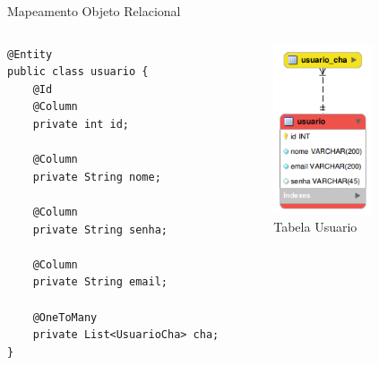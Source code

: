 \documentclass[xcolor=dvipsnames]{beamer}
\begin{document}
\begin{frame}[fragile]{Mapeamento Objeto Relacional}
	\begin{columns}[c]
			\begin{lstlisting}
@Entity
public class usuario {
	@Id
	@Column
	private int id;

	@Column
	private String nome;

	@Column
	private String senha;
		
	@Column
	private String email;		
	
	@OneToMany
	private List<UsuarioCha> cha;
}
			\end{lstlisting}							
			\begin{figure}[!htb]
				\centering
				\includegraphics[keepaspectratio=true,height=5cm]{usuario-ER.png}
				\caption{Tabela Usuario}
				\label{usuario-ER}
			\end{figure}	
	\end{columns}
\end{frame}
\end{document}
